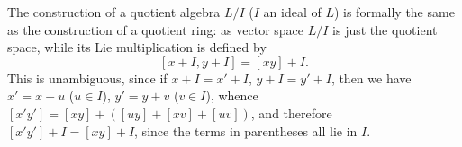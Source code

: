 The construction of a quotient algebra $L/I$ ($I$ an ideal of $L$) is formally the same as the construction of a quotient ring: as vector space $L/I$ is just the quotient space, while its Lie multiplication is defined by
$$[x+I, y+I] = [xy]+I.$$
This is unambiguous, since if $x+I = x'+I$, $y+I = y'+I$, then we have $x' = x+u$ ($u \in I$), $y' = y+v$ ($v \in I$), whence $[x'y'] = [xy] + ([uy] + [xv] + [uv])$, and therefore $[x'y']+I = [xy]+I$, since the terms in parentheses all lie in $I$.
